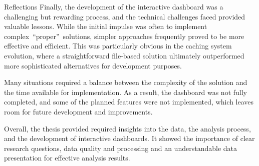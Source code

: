 \begin{section}{Reflections}
	Finally, the development of the interactive dashboard was a challenging but rewarding process, and the technical challenges faced provided valuable lessons.
	While the initial impulse was often to implement complex~\enquote{proper}~solutions, simpler approaches frequently proved to be more effective and efficient.
	This was particularly obvious in the caching system evolution, where a straightforward file-based solution ultimately outperformed more sophisticated alternatives for development purposes.

	Many situations required a balance between the complexity of the solution and the time available for implementation.
	As a result, the dashboard was not fully completed, and some of the planned features were not implemented, which leaves room for future development and improvements.

	Overall, the thesis provided required insights into the data, the analysis process, and the development of interactive dashboards.
	It showed the importance of clear research questions, data quality and processing and an understandable data presentation for effective analysis results.
\end{section}

